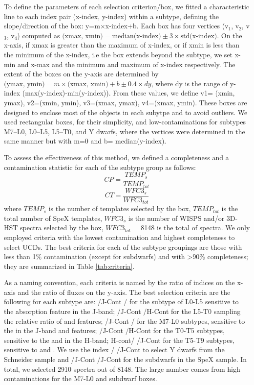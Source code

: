 \documentclass[manuscript]{aastex63}
\begin{document}
To define the parameters of each selection criterion/box, we fitted a characteristic line to each index pair (x-index, y-index) within a subtype, defining the slope/direction of the box: y=m$\times$x-index+b. Each box has four vertices (v$_1$, v$_2$, v$_3$, v$_4$)  computed as 
$\text{(xmax, xmin)}= \text{median(x-index)} \pm 3 \times \text{std(x-index)}$. On the x-axis, if xmax is greater than the maximum of x-index, or  if xmin is less than the minimum of the x-index, i.e the box extends beyond the subtype, we set x-min and x-max and the minimum and maximum of x-index respectively. The extent of the boxes on the y-axis are determined by $\text{(ymax, ymin)}= m \times \text{(xmax, xmin)} + b \pm 0.4 \times dy$, where dy is the range of y-index (max(y-index)-min(y-index)). From these values, we define v1= (xmin, ymax), v2=(xmin, ymin), v3=(xmax, ymax), v4=(xmax, ymin). These boxes are designed to enclose most of the objects in each subytpe and to avoid outliers. We used rectangular boxes, for their simplicity, and low-contaminations for subtypes M7--L0, L0--L5, L5--T0, and Y dwarfs, where the vertices were determined in the same manner but with m=0 and b= median(y-index). 

To assess the effectiveness of this method, we defined a completeness and a contamination statistic for each of the subtype group  as follows: 
 \begin{equation} CP=\frac{TEMP_s}{TEMP_{tot}} \end{equation}
\begin{equation} CT= \frac{WFC3_s}{WFC3_{tot}} \end{equation} where $TEMP_s$ is the number of templates selected by the box, $TEMP_{tot}$ is the total number of SpeX templates, $WFC3_s$ is the number of WISPS and/or 3D-HST spectra selected by the box, $WFC3_{tot}$ = 8148 is the total of spectra. We only employed criteria with the lowest contamination and highest completeness to select UCDs. The best criteria for each of the subtype groupings are  those with less than 1\% contamination (except for subdwarfs) and with \textgreater 90\% completeness; they are summarized in Table \ref{tab:criteria}. 

As a naming convention, each criteria is named by the ratio of indices on the x-axis and the ratio of fluxes on the y-axis. The best selection criteria are the following for each subtype are: /J-Cont / for the subtype of L0-L5 sensitive to the \indxwat absorption feature in the J-band; /J-Cont \indxmeth/H-Cont for the L5-T0 sampling the relative ratio of \indxwat and \meth features; /J-Cont \indxmeth/ for the M7-L0 subtypes, sensitive to the \wat in the J-band and \meth features; /J-Cont \indxmeth/H-Cont for the T0-T5 subtypes, sensitive to the \wat and \meth in the H-band; H-cont/ \indxmeth/J-Cont for the T5-T9 subtypes, sensitive to \wat and \meth. We use the index \indxmeth/ /J-Cont to select Y dwarfs from the Schneider sample and  /J-Cont \indxmeth/J-Cont for the subdwarfs in the SpeX sample. In total, we selected 2910 spectra out of 8148. The large number comes from high contaminations for the M7-L0 and subdwarf boxes. 
 
\end{document}
